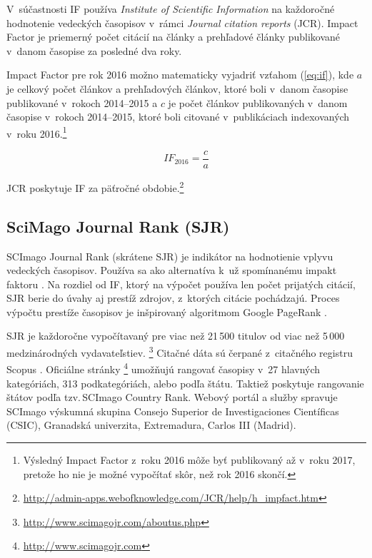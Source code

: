 V~súčastnosti IF používa \emph{Institute of Scientific Information} na
každoročné hodnotenie vedeckých časopisov v~rámci \emph{Journal citation
reports} (JCR).  Impact Factor je priemerný počet citácií na články a
prehľadové články publikované v~danom časopise za posledné dva roky.

Impact Factor pre rok 2016 možno matematicky vyjadriť vzťahom (\ref{eq:if}),
kde $a$ je celkový počet článkov a prehľadových článkov, ktoré boli v~danom
časopise publikované v~rokoch 2014--2015 a $c$ je počet článkov publikovaných
v~danom časopise v~rokoch 2014--2015, ktoré boli citované v~publikáciach
indexovaných v~roku 2016.\footnote{Výsledný Impact Factor z~roku 2016 môže byť
publikovaný až v~roku 2017, pretože ho nie je možné vypočítať skôr, než rok
2016 skončí.}

\begin{equation}
\label{eq:if}
\mathit{IF}_{2016} = \frac{c}{a}
\end{equation}

\noindent JCR poskytuje IF za päťročné obdobie.\footnote{\url{http://admin-apps.webofknowledge.com/JCR/help/h_impfact.htm}}

\subsection{SciMago Journal Rank (SJR)}
\label{sec:sjr}

SCImago Journal Rank (skrátene SJR) je indikátor na hodnotienie vplyvu
vedeckých časopisov. Používa sa ako alternatíva k~už spomínanému impakt faktoru
\citep{Falagas2008}.  Na rozdiel od IF, ktorý na výpočet používa len počet prijatých
citácií, SJR berie do úvahy aj prestíž zdrojov, z~ktorých citácie pochádzajú.
Proces výpočtu prestíže časopisov \citep{GuerreroBote2012} je inšpirovaný algoritmom
Google PageRank\texttrademark{} \citep{Page1999}.

SJR je každoročne vypočítavaný pre viac než 21\,500 titulov od viac než 5\,000
medzinárodných vydavateľstiev.
\footnote{\url{http://www.scimagojr.com/aboutus.php}} Citačné dáta sú čerpané
z~citačného registru Scopus \textregistered. Oficiálne stránky
\footnote{\url{http://www.scimagojr.com}} umožňujú rangovať časopisy v~27
hlavných kategóriách, 313 podkategóriách, alebo podľa štátu.  Taktiež poskytuje
rangovanie štátov podľa tzv.\,SCImago Country Rank.  Webový portál a služby
spravuje SCImago výskumná skupina Consejo Superior de Investigaciones
Científicas (CSIC), Granadská univerzita, Extremadura, Carlos III (Madrid).


